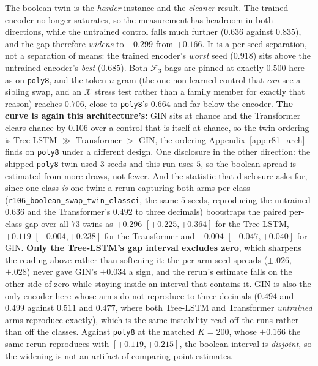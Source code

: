 \noindent The boolean twin is the \emph{harder} instance and the \emph{cleaner} result. The trained encoder no longer saturates, so the measurement has headroom in both directions, while the untrained control falls much further ($0.636$ against $0.835$), and the gap therefore \emph{widens} to $\mathbf{+0.299}$ from $+0.166$. It is a per-seed separation, not a separation of means: the trained encoder's \emph{worst} seed ($0.918$) sits above the untrained encoder's \emph{best} ($0.685$). Both $\mathcal{F}_3$ bags are pinned at exactly $0.500$ here as on \texttt{poly8}, and the token $n$-gram (the one non-learned control that \emph{can} see a sibling swap, and an $\mathcal{X}$ stress test rather than a family member for exactly that reason) reaches $0.706$, close to \texttt{poly8}'s $0.664$ and far below the encoder. \textbf{The curve is again this architecture's:} GIN sits at chance and the Transformer clears chance by $0.106$ over a control that is itself at chance, so the twin ordering is Tree-LSTM $\gg$ Transformer $>$ GIN, the ordering Appendix~\ref{app:r81_arch} finds on \texttt{poly8} under a different design. One disclosure in the other direction: the shipped \texttt{poly8} twin used $3$ seeds and this run uses $5$, so the boolean spread is estimated from more draws, not fewer. And the statistic that disclosure asks for, since one class \emph{is} one twin: a rerun capturing both arms per class (\texttt{r106\_boolean\_swap\_twin\_classci}, the same $5$ seeds, reproducing the untrained $0.636$ and the Transformer's $0.492$ to three decimals) bootstraps the paired per-class gap over all $73$ twins as $+0.296$ $[+0.225,+0.364]$ for the Tree-LSTM, $+0.119$ $[-0.004,+0.238]$ for the Transformer and $-0.004$ $[-0.047,+0.040]$ for GIN. \textbf{Only the Tree-LSTM's gap interval excludes zero}, which sharpens the reading above rather than softening it: the per-arm seed spreads ($\pm.026$, $\pm.028$) never gave GIN's $+0.034$ a sign, and the rerun's estimate falls on the other side of zero while staying inside an interval that contains it. GIN is also the only encoder here whose arms do not reproduce to three decimals ($0.494$ and $0.499$ against $0.511$ and $0.477$, where both Tree-LSTM and Transformer \emph{untrained} arms reproduce exactly), which is the same instability read off the runs rather than off the classes. Against \texttt{poly8} at the matched $K{=}200$, whose $+0.166$ the same rerun reproduces with $[+0.119,+0.215]$, the boolean interval is \emph{disjoint}, so the widening is not an artifact of comparing point estimates.

